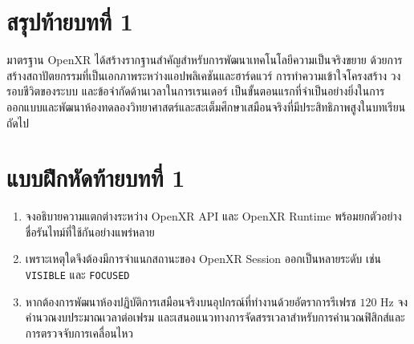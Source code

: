 \section*{สรุปท้ายบทที่ 1}


มาตรฐาน OpenXR ได้สร้างรากฐานสำคัญสำหรับการพัฒนาเทคโนโลยีความเป็นจริงขยาย ด้วยการสร้างสถาปัตยกรรมที่เป็นเอกภาพระหว่างแอปพลิเคชันและฮาร์ดแวร์ การทำความเข้าใจโครงสร้าง วงรอบชีวิตของระบบ และข้อจำกัดด้านเวลาในการเรนเดอร์ เป็นขั้นตอนแรกที่จำเป็นอย่างยิ่งในการออกแบบและพัฒนาห้องทดลองวิทยาศาสตร์และสะเต็มศึกษาเสมือนจริงที่มีประสิทธิภาพสูงในบทเรียนถัดไป

\clearpage

\section*{แบบฝึกหัดท้ายบทที่ 1}

\begin{enumerate}
    \item จงอธิบายความแตกต่างระหว่าง OpenXR API และ OpenXR Runtime พร้อมยกตัวอย่างชื่อรันไทม์ที่ใช้กันอย่างแพร่หลาย
    \item เพราะเหตุใดจึงต้องมีการจำแนกสถานะของ OpenXR Session ออกเป็นหลายระดับ เช่น \texttt{VISIBLE} และ \texttt{FOCUSED}
    \item หากต้องการพัฒนาห้องปฏิบัติการเสมือนจริงบนอุปกรณ์ที่ทำงานด้วยอัตราการรีเฟรช $120\text{ Hz}$ จงคำนวณงบประมาณเวลาต่อเฟรม และเสนอแนวทางการจัดสรรเวลาสำหรับการคำนวณฟิสิกส์และการตรวจจับการเคลื่อนไหว
\end{enumerate}
